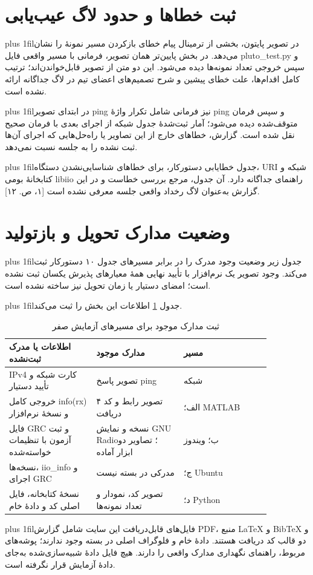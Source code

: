 \documentclass[10pt,a4paper]{article}
\newcommand{\rtl}[1]{\beginR #1\endR}
\newcommand{\lr}[1]{\beginL{\latinfont #1}\endL}
\newcommand{\rp}[1]{\par\begingroup\rightskip=0pt\leftskip=0pt plus 1fil\parfillskip=0pt\noindent\beginR #1\endR\par\endgroup}
\begin{document}
\section{\rtl{ثبت خطاها و حدود لاگ عیب‌یابی}}
\rp{در تصویر پایتون، بخشی از ترمینال پیام خطای بازکردن مسیر نمونهٔ \lr{C:\textbackslash{}path\textbackslash{}to\textbackslash{}your\_script.py} را نشان می‌دهد. در بخش پایین‌تر همان تصویر، فرمانی با مسیر واقعی فایل pluto\_test.py و سپس خروجی تعداد نمونه‌ها دیده می‌شود. این دو متن از تصویر قابل‌خواندن‌اند؛ ترتیب کامل اقدام‌ها، علت خطای پیشین و شرح تصمیم‌های اعضای تیم در لاگ جداگانه ارائه نشده است.}

\rp{در ابتدای تصویر ping نیز فرمانی شامل تکرار واژهٔ ping و سپس فرمان متوقف‌شده دیده می‌شود؛ آمار ثبت‌شدهٔ جدول شبکه از اجرای بعدی با فرمان صحیح نقل شده است. گزارش، خطاهای خارج از این تصاویر یا راه‌حل‌هایی که اجرای آن‌ها ثبت نشده را به جلسه نسبت نمی‌دهد.}

\rp{جدول خطایابی دستورکار، برای خطاهای شناسایی‌نشدن دستگاه، URI شبکه و کتابخانهٔ بومی libiio راهنمای جداگانه دارد. آن جدول، مرجع بررسی خطاست و در این گزارش به‌عنوان لاگ رخداد واقعی جلسه معرفی نشده است [۱، ص. ۱۲].}

\section{\rtl{وضعیت مدارک تحویل و بازتولید}}
\rp{جدول زیر وضعیت وجود مدرک را در برابر مسیرهای جدول ۱۰ دستورکار ثبت می‌کند. وجود تصویر یک نرم‌افزار با تأیید نهایی همهٔ معیارهای پذیرش یکسان ثبت نشده است؛ امضای دستیار یا زمان تحویل نیز ساخته نشده است.}

\rp{جدول \ref{tab:readiness} اطلاعات این بخش را ثبت می‌کند.}
\begin{table}[H]\centering\small\renewcommand{\arraystretch}{1.25}
\begin{tabular}{|p{0.288\linewidth}|p{0.288\linewidth}|p{0.288\linewidth}|}\hline
\rtl{\textbf{اطلاعات یا مدرک ثبت‌نشده}} & \rtl{\textbf{مدارک موجود}} & \rtl{\textbf{مسیر}} \\ \hline
\rtl{IPv4 کارت شبکه و تأیید دستیار} & \rtl{تصویر پاسخ ping} & \rtl{شبکه} \\ \hline
\rtl{خروجی کامل info(rx) و نسخهٔ نرم‌افزار} & \rtl{۴ تصویر رابط و کد دریافت} & \rtl{الف؛ MATLAB} \\ \hline
\rtl{فایل GRC و ثبت آزمون با تنظیمات خواسته‌شده} & \rtl{نسخه و نمایش GNU Radio؛ تصاویر دو ابزار آماده} & \rtl{ب؛ ویندوز} \\ \hline
\rtl{نسخه‌ها، iio\_info و اجرای GRC} & \rtl{مدرکی در بسته نیست} & \rtl{ج؛ Ubuntu} \\ \hline
\rtl{نسخهٔ کتابخانه، فایل اصلی کد و دادهٔ خام} & \rtl{تصویر کد، نمودار و تعداد نمونه‌ها} & \rtl{د؛ Python} \\ \hline
\end{tabular}\caption{\rtl{ثبت مدارک موجود برای مسیرهای آزمایش صفر}}\label{tab:readiness}\end{table}
\rp{فایل‌های قابل‌دریافت این سایت شامل گزارش PDF، منبع LaTeX و BibTeX و دو قالب کد دریافت هستند. دادهٔ خام و فلوگراف اصلی در بسته وجود ندارند؛ پوشه‌های مربوط، راهنمای نگهداری مدارک واقعی را دارند. هیچ فایل دادهٔ شبیه‌سازی‌شده به‌جای دادهٔ آزمایش قرار نگرفته است.}
\end{document}
